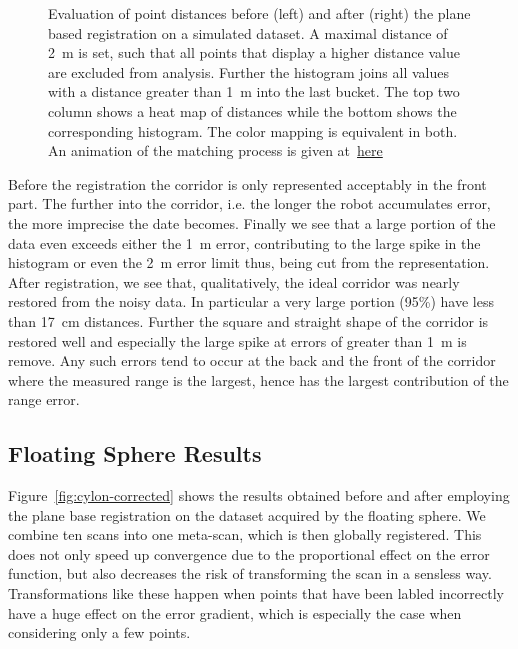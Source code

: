 \begin{figure}
\begin{minipage}[c]{0.49\textwidth}
  	\end{minipage} 	
 	\caption{Evaluation of point distances before (left) and after (right) the plane based registration on a simulated dataset. A maximal distance of \SI{2}{m} is set, such that all points that display a higher distance value are excluded from analysis. Further the histogram joins all values with a distance greater than \SI{1}{m} into the last bucket. The top two column shows a heat map of distances while the bottom shows the corresponding histogram. The color mapping is equivalent in both. An animation of the matching process is given at~\href{https://youtu.be/0ps5Pg4qo4E}{here}}
 	\label{fig:simulatedEvaluation}
\end{figure} 

Before the registration the corridor is only represented acceptably in the front part. 
The further into the corridor, i.e. the longer the robot accumulates error, the more imprecise the date becomes. 
Finally we see that a large portion of the data even exceeds either the \SI{1}{\meter} error, contributing to the large spike in the histogram or even the \SI{2}{\meter} error limit thus, being cut from the representation. 
After registration, we see that, qualitatively, the ideal corridor was nearly restored from the noisy data. 
In particular a very large portion (95\%) have less than \SI{17}{\centi\meter} distances.
Further the square and straight shape of the corridor is restored well and especially the large spike at errors of greater than \SI{1}{m} is remove. 
Any such errors tend to occur at the back and the front of the corridor where the measured range is the largest, hence has the largest contribution of the range error. 

\subsection{Floating Sphere Results}

Figure~\ref{fig:cylon-corrected} shows the results obtained before and after employing the plane base registration on the dataset acquired by the floating sphere.
We combine ten scans into one meta-scan, which is then globally registered.
This does not only speed up convergence due to the proportional effect on the error function, but also decreases the risk of transforming the scan in a sensless way.
Transformations like these happen when points that have been labled incorrectly have a huge effect on the error gradient, which is especially the case when considering only a few points.

